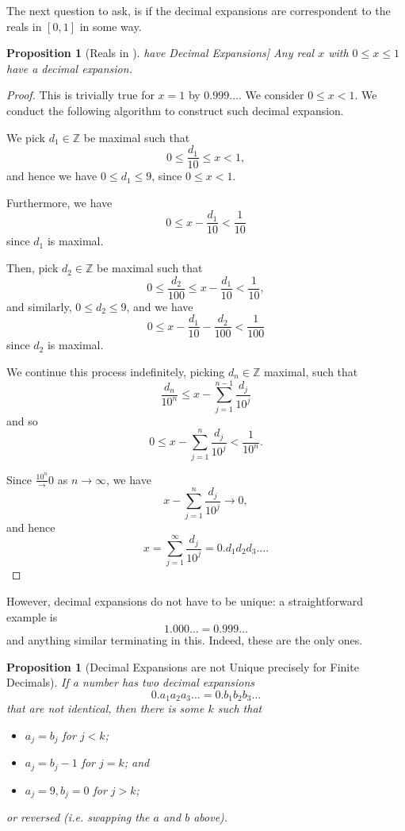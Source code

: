 \documentclass{article}
\newtheorem{proposition}[theorem]{Proposition}
\theoremstyle{definition}
\theoremstyle{remark}
\newcommand{\ccintv}[2]{[#1,#2]}
\newcommand{\ZZ}{\mathbb{Z}}
\begin{document}
The next question to ask, is if the decimal expansions are correspondent to the reals in \(\ccintv{0}{1}\) in some way.

\begin{proposition}[Reals in \(\ccintv{0}{1}\) have Decimal Expansions]
    Any real \(x\) with \(0 \leq x \leq 1\) have a decimal expansion.
\end{proposition}

\begin{proof}
    This is trivially true for \(x = 1\) by \(0.999\ldots\). We consider \(0 \leq x < 1\). We conduct the following algorithm to construct such decimal expansion.

    We pick \(d_1 \in \ZZ\) be maximal such that
    \[
        0 \leq \frac{d_1}{10} \leq x < 1,
    \]
    and hence we have \(0 \leq d_1 \leq 9\), since \(0 \leq x < 1\).

    Furthermore, we have
    \[
        0 \leq x - \frac{d_1}{10} < \frac{1}{10}
    \]
    since \(d_1\) is maximal.

    Then, pick \(d_2 \in \ZZ\) be maximal such that
    \[
        0 \leq \frac{d_2}{100} \leq x - \frac{d_1}{10} < \frac{1}{10},
    \]
    and similarly, \(0 \leq d_2 \leq 9\), and we have
    \[
        0 \leq x - \frac{d_1}{10} - \frac{d_2}{100} < \frac{1}{100}
    \]
    since \(d_2\) is maximal.

    We continue this process indefinitely, picking \(d_n \in \ZZ\) maximal, such that
    \[
        \frac{d_n}{10^n} \leq x - \sum_{j = 1}^{n - 1} \frac{d_j}{10^j}
    \]
    and so
    \[
        0 \leq x - \sum_{j = 1}^{n} \frac{d_j}{10^j} < \frac{1}{10^n}.
    \]

    Since \(\frac{10^n} \to 0\) as \(n \to \infty\), we have
    \[
        x - \sum_{j = 1}^{n} \frac{d_j}{10^j} \to 0,
    \]
    and hence
    \[
        x = \sum_{j = 1}^{\infty} \frac{d_j}{10^j} = 0.d_1 d_2 d_3 \ldots.
    \]
\end{proof}

However, decimal expansions do not have to be unique: a straightforward example is
\[
    1.000\ldots = 0.999\ldots
\]
and anything similar terminating in this. Indeed, these are the only ones.

\begin{proposition}[Decimal Expansions are not Unique precisely for Finite Decimals]
    If a number has two decimal expansions
    \[
        0.a_1 a_2 a_3 \ldots = 0.b_1 b_2 b_3 \ldots
    \]
    that are not identical, then there is some \(k\) such that
    \begin{itemize}
        \item \(a_j = b_j\) for \(j < k\);
        \item \(a_j = b_j - 1\) for \(j = k\); and
        \item \(a_j = 9, b_j = 0\) for \(j > k\);
    \end{itemize}
    or reversed (i.e. swapping the \(a\) and \(b\) above).
\end{proposition}
\end{document}
